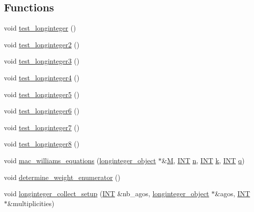 \subsection*{Functions}
\begin{DoxyCompactItemize}
\item 
void \mbox{\hyperlink{longinteger__domain_8_c_aded6998d4e49439df8f00e8312030c56}{test\+\_\+longinteger}} ()
\item 
void \mbox{\hyperlink{longinteger__domain_8_c_a6312b79adc047bd18cf5835ffc327267}{test\+\_\+longinteger2}} ()
\item 
void \mbox{\hyperlink{longinteger__domain_8_c_a501b1cdc2073b478d7cdd87668f99954}{test\+\_\+longinteger3}} ()
\item 
void \mbox{\hyperlink{longinteger__domain_8_c_a5aaf151e49107ec7885de182a0b4f1d6}{test\+\_\+longinteger4}} ()
\item 
void \mbox{\hyperlink{longinteger__domain_8_c_a20cf6bab69aff33415743fe5200438cd}{test\+\_\+longinteger5}} ()
\item 
void \mbox{\hyperlink{longinteger__domain_8_c_ad78d3cbf43d68a8e869de5c4b9ec7270}{test\+\_\+longinteger6}} ()
\item 
void \mbox{\hyperlink{longinteger__domain_8_c_a7c9b08fdee098a02619ee54854b37402}{test\+\_\+longinteger7}} ()
\item 
void \mbox{\hyperlink{longinteger__domain_8_c_a326c3423e5bf4e9eb64017044b3b9c31}{test\+\_\+longinteger8}} ()
\item 
void \mbox{\hyperlink{longinteger__domain_8_c_ab961335354336870064bacc0a101eab6}{mac\+\_\+williams\+\_\+equations}} (\mbox{\hyperlink{classlonginteger__object}{longinteger\+\_\+object}} $\ast$\&\mbox{\hyperlink{plane__search_8_c_ad2d23ebd03187a91edd45b1d5e496265}{M}}, \mbox{\hyperlink{galois_8h_a09fddde158a3a20bd2dcadb609de11dc}{I\+NT}} \mbox{\hyperlink{simeon_8_c_a7f2cd26777ce0ff3fdaf8d02aacbddfb}{n}}, \mbox{\hyperlink{galois_8h_a09fddde158a3a20bd2dcadb609de11dc}{I\+NT}} \mbox{\hyperlink{simeon_8_c_a43fa990200c3ddd47c35f151bd4d66bf}{k}}, \mbox{\hyperlink{galois_8h_a09fddde158a3a20bd2dcadb609de11dc}{I\+NT}} \mbox{\hyperlink{simeon_8_c_a92cbb483a3b27ae1a0dbfcb125ce216f}{q}})
\item 
void \mbox{\hyperlink{longinteger__domain_8_c_abb1c062e06118b77cea684f245ebaf0a}{determine\+\_\+weight\+\_\+enumerator}} ()
\item 
void \mbox{\hyperlink{longinteger__domain_8_c_aa70667f6d81325e56b8a7686d19839e7}{longinteger\+\_\+collect\+\_\+setup}} (\mbox{\hyperlink{galois_8h_a09fddde158a3a20bd2dcadb609de11dc}{I\+NT}} \&nb\+\_\+agos, \mbox{\hyperlink{classlonginteger__object}{longinteger\+\_\+object}} $\ast$\&agos, \mbox{\hyperlink{galois_8h_a09fddde158a3a20bd2dcadb609de11dc}{I\+NT}} $\ast$\&multiplicities)

\end{DoxyCompactItemize}
